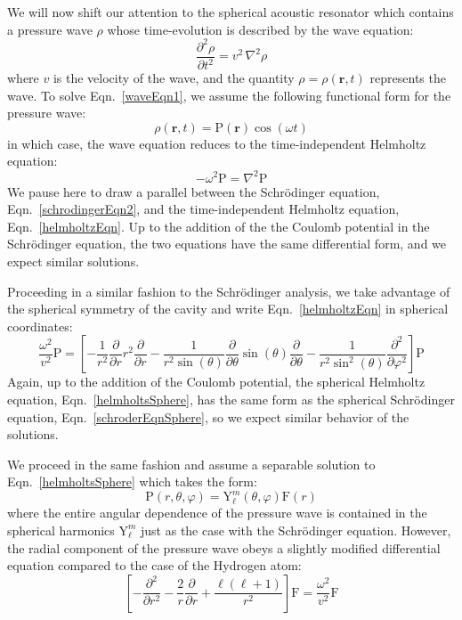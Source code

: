 \documentclass[12pt]{article}
\renewcommand{\vec}[1]{\mathbf{#1}} %
\newcommand{\ppd}[1]{\frac{\partial}{\partial#1}}
\newcommand{\ppsd}[1]{\frac{\partial^2}{\partial #1^2}}
\newcommand{\ppsnd}[2]{\frac{\partial^2 #1}{\partial #2^2}}
\newcommand{\lap}{\nabla^2}
\let\originaleqref=\eqref
\renewcommand{\eqref}{Eqn.\ \originaleqref}
\begin{document}
\hrulefill

We will now shift our attention to the spherical acoustic resonator which contains a pressure wave $\rho$ whose time-evolution is described by the wave equation:
\begin{equation}
	\label{waveEqn1}
	\ppsnd{\rho}{t} = v^2 \, \lap\rho
\end{equation}
where $v$ is the velocity of the wave, and the quantity $\rho = \rho(\vec{r},t)$ represents the wave. To solve \eqref{waveEqn1}, we assume the following functional form for the pressure wave:
\begin{equation}
\label{waveSoln}
	\rho(\vec{r},t) = \mathrm{P}(\vec{r})\cos(\omega t)
\end{equation}
in which case, the wave equation reduces to the time-independent Helmholtz equation:
\begin{equation}
\label{helmholtzEqn}
	-\omega^2 \mathrm{P} = \lap \mathrm{P}
\end{equation}
We pause here to draw a parallel between the Schr\"odinger equation, \eqref{schrodingerEqn2}, and the time-independent Helmholtz equation, \eqref{helmholtzEqn}. Up to the addition of the the Coulomb potential in the Schr\"odinger equation, the two equations have the same differential form, and we expect similar solutions.

Proceeding in a similar fashion to the Schr\"odinger analysis, we take advantage of the spherical symmetry of the cavity and write \eqref{helmholtzEqn} in spherical coordinates:
\begin{equation}
\label{helmholtsSphere}
	\frac{\omega^2}{v^2} \mathrm{P} = \left[ -\frac{1}{r^2} \ppd{r}r^2\ppd{r} - \frac{1}{r^2\sin(\theta)}\ppd{\theta}\sin(\theta)\ppd{\theta} -\frac{1}{r^2\sin^2(\theta)} \ppsd{\varphi} \right] \mathrm{P}
\end{equation}
Again, up to the addition of the Coulomb potential, the spherical Helmholtz equation, \eqref{helmholtsSphere}, has the same form as the spherical Schr\"odinger equation,  \eqref{schroderEqnSphere}, so we expect similar behavior of the solutions.

We proceed in the same fashion and assume a separable solution to \eqref{helmholtsSphere} which takes the form:
\begin{equation}
	\mathrm{P}(r,\theta,\varphi) = \mathrm{Y}_\ell^m(\theta,\varphi) \mathrm{F}(r)
\end{equation}
where the entire angular dependence of the pressure wave is contained in the spherical harmonics $\mathrm{Y}_\ell^m$ just as the case with the Schr\"odinger equation. However, the radial component of the pressure wave obeys a slightly modified differential equation compared to the case of the Hydrogen atom:
\begin{equation}
	\left[ -\ppsd{r} - \frac{2}{r}\ppd{r} + \frac{\ell(\ell+1)}{r^2} \right] \mathrm{F} = \frac{\omega^2}{v^2}\mathrm{F}
\end{equation}
	
\end{document}
